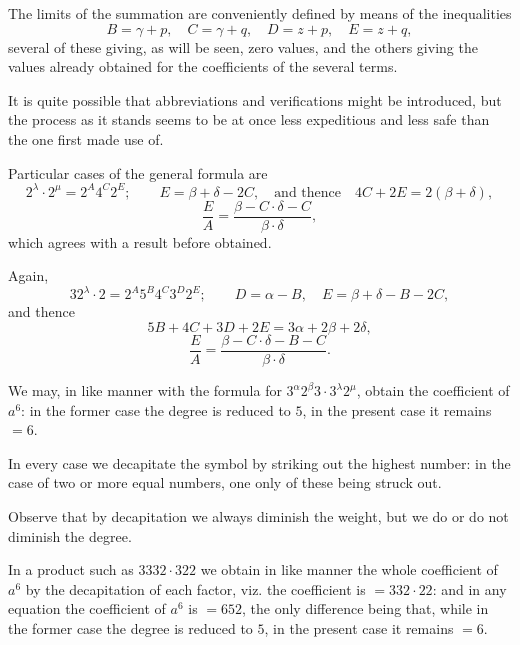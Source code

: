 \documentclass[11pt,a4paper]{book}
\begin{document}
\begin{art}
The limits of the summation are conveniently defined by means of the inequalities
\[
B = \gamma + p, \quad C = \gamma + q, \quad D = z + p, \quad E = z + q,
\]
several of these giving, as will be seen, zero values, and the others giving the values already obtained for the coefficients of the several terms.
\end{art}

\begin{art}
It is quite possible that abbreviations and verifications might be introduced, but the process as it stands seems to be at once less expeditious and less safe than the one first made use of.
\end{art}

\begin{art}
Particular cases of the general formula are
\[
2^\lambda \cdot 2^\mu = 2^A 4^C 2^E; \qquad E = \beta + \delta - 2C, \quad \text{and thence} \quad 4C + 2E = 2(\beta + \delta),
\]
\[
\frac{E}{A} = \frac{\beta - C \cdot \delta - C}{\beta \cdot \delta},
\]
which agrees with a result before obtained.

Again,
\[
32^\lambda \cdot 2 = 2^A 5^B 4^C 3^D 2^E; \qquad D = \alpha - B, \quad E = \beta + \delta - B - 2C,
\]
and thence
\[
5B + 4C + 3D + 2E = 3\alpha + 2\beta + 2\delta,
\]
\[
\frac{E}{A} = \frac{\beta - C \cdot \delta - B - C}{\beta \cdot \delta}.
\]
\end{art}

\begin{art}
We may, in like manner with the formula for $3^\alpha 2^\beta 3 \cdot 3^\lambda 2^\mu$, obtain the coefficient of $a^6$: in the former case the degree is reduced to $5$, in the present case it remains $= 6$.

In every case we decapitate the symbol by striking out the highest number: in the case of two or more equal numbers, one only of these being struck out.

Observe that by decapitation we always diminish the weight, but we do or do not diminish the degree.
\end{art}

\begin{art}
In a product such as $3332 \cdot 322$ we obtain in like manner the whole coefficient of $a^6$ by the decapitation of each factor, viz. the coefficient is $= 332 \cdot 22$: and in any equation the coefficient of $a^6$ is $= 652$, the only difference being that, while in the former case the degree is reduced to $5$, in the present case it remains $= 6$.
\end{art}
\end{document}
